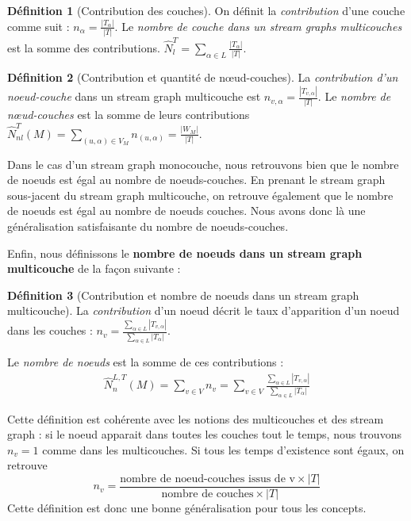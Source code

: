 \documentclass[11pt,a4paper]{article}
\theoremstyle{definition}
\newtheorem{defn}{Définition}
\theoremstyle{remark}
\theoremstyle{remark}
\def \stg {stream graph}
\def \stgm {stream graph multicouche}
\def \stgms {stream graphs multicouches}
\begin{document}
	
	\begin{defn}[Contribution des couches]
	On définit la {\em contribution} d'une couche comme suit : $n_\alpha = \frac{|T_{\alpha}|}{|T|}$. Le {\em nombre de couche dans un \stgms{}} est la somme des contributions. $\hat{N}^T_l = \sum_{\alpha \in L}\frac{ |T_{\alpha}|}{|T|}$.
    \end{defn}
	
	\begin{defn}[Contribution et quantité de nœud-couches]
	La {\em contribution d'un noeud-couche} dans un \stgm{} est $n_{v,\alpha} = \frac{|T_{v,\alpha}|}{|T|}$. Le {\em nombre de nœud-couches} est la somme de leurs contributions $\hat{N}^{T}_{nl}(M) = \underset{(u,\alpha)\in V_M}{\sum} n_{(u,\alpha)} = \frac{|W_M|}{|T|}$.
    \end{defn}
	
	Dans le cas d'un \stg{} monocouche, nous retrouvons bien que le nombre de noeuds est égal au nombre de noeuds-couches. En prenant le \stg{} sous-jacent du \stgm{}, on retrouve également que le nombre de noeuds est égal au nombre de noeuds couches. Nous avons donc là une généralisation satisfaisante du nombre de noeuds-couches.
    
   Enfin, nous définissons le \textbf{nombre de noeuds dans un \stgm{}} de la façon suivante : 
    
    \begin{defn}[Contribution et nombre de noeuds dans un \stgm{}]
    La {\em contribution} d'un noeud décrit le taux d'apparition d'un noeud dans les couches : $n_v = \frac{\sum_{\alpha \in L}|T_{v,\alpha}|}{\sum_{\alpha \in L} |T_{\alpha}|}$.
    
    Le {\em nombre de noeuds} est la somme de ces contributions :
    \begin{align}
    \hat{N}^{L,T}_n(M) = \sum_{v\in V} n_v= \sum_{v\in V} \frac{\sum_{\alpha \in L}|T_{v,\alpha}|}{\sum_{\alpha \in L} |T_{\alpha}|} 
    \label{numberNodes}
	\end{align}     
	
	\end{defn}
	
	Cette définition est cohérente avec les notions des multicouches et des \stg{} : si le noeud apparait dans toutes les couches tout le temps, nous trouvons $n_v=1$ comme dans les multicouches. Si tous les temps d'existence sont égaux, on retrouve $$n_v=\frac{\text{nombre de noeud-couches issus de v}\times |T|}{\text{nombre de couches}\times |T|}$$ Cette définition est donc une bonne généralisation pour tous les concepts.
\end{document}
